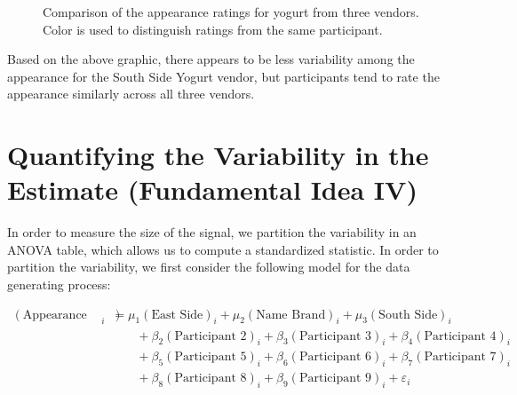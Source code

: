\documentclass[
  letterpaper,
  DIV=11,
  numbers=noendperiod]{scrreprt}
\theoremstyle{definition}
\theoremstyle{definition}
\theoremstyle{plain}
\theoremstyle{remark}
\begin{document}
\begin{figure}


\caption{\label{fig-blockrecap-plot}Comparison of the appearance ratings
for yogurt from three vendors. Color is used to distinguish ratings from
the same participant.}

\end{figure}%

Based on the above graphic, there appears to be less variability among
the appearance for the South Side Yogurt vendor, but participants tend
to rate the appearance similarly across all three vendors.

\section{Quantifying the Variability in the Estimate (Fundamental Idea
IV)}\label{quantifying-the-variability-in-the-estimate-fundamental-idea-iv-2}

In order to measure the size of the signal, we partition the variability
in an ANOVA table, which allows us to compute a standardized statistic.
In order to partition the variability, we first consider the following
model for the data generating process:

\[
\begin{aligned}
  (\text{Appearance Rating})_i 
    &= \mu_1 (\text{East Side})_i + \mu_2 (\text{Name Brand})_i + \mu_3 (\text{South Side})_i \\
    &\qquad + \beta_2 (\text{Participant 2})_i + \beta_3 (\text{Participant 3})_i + \beta_4 (\text{Participant 4})_i \\
    &\qquad + \beta_5 (\text{Participant 5})_i + \beta_6 (\text{Participant 6})_i + \beta_7 (\text{Participant 7})_i \\
    &\qquad + \beta_8 (\text{Participant 8})_i + \beta_9 (\text{Participant 9})_i + \varepsilon_i
\end{aligned}
\]
\end{document}
